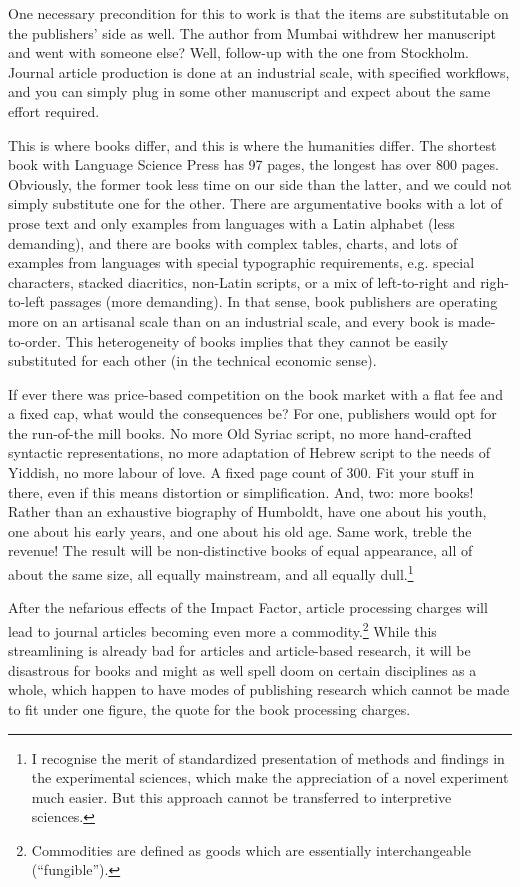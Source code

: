 \documentclass[12pt]{article}
\begin{document}
 One necessary precondition for this to work is that the items are substitutable on the publishers' side as well. The author from Mumbai withdrew her manuscript and went with someone else? Well, follow-up with the one from Stockholm. Journal article production is done at an industrial scale, with specified workflows, and you can simply plug in some other manuscript and expect about the same effort required. 
 
 This is where books differ, and this is where the humanities differ. The shortest book with Language Science Press has 97 pages, the longest has over 800 pages. Obviously, the former took less time on our side than the latter, and we could not simply substitute one for the other. There are argumentative books with a lot of prose text and only examples from languages with a Latin alphabet (less demanding), and there are books with complex tables, charts, and lots of examples from languages with special typographic requirements, e.g. special characters, stacked diacritics, non-Latin scripts, or a mix of left-to-right and righ-to-left passages (more demanding). In that sense, book publishers are operating more on an artisanal scale than on an industrial scale, and every book is made-to-order. This heterogeneity of books implies that they cannot be easily substituted for each other (in the technical economic sense).
 
 If ever there was price-based competition on the book market with a flat fee and a fixed cap, what would the consequences be? For one, publishers would opt for the run-of-the mill books. No more Old Syriac script,%
 no more hand-crafted syntactic representations, no more adaptation of Hebrew script to the needs of Yiddish, no more labour of love. A fixed page count of 300. Fit your stuff in there, even if this means distortion or simplification. And, two: more books! Rather than an exhaustive biography of Humboldt, have one about his youth, one about his early years, and one about his old age. Same work, treble the revenue! The result will be non-distinctive books of equal appearance, all of about the same size, all equally mainstream, and all equally dull.\footnote{I recognise the merit of standardized presentation of methods and findings in the experimental sciences, which make the appreciation of a novel experiment much easier. But this approach cannot be transferred to interpretive sciences.}
 
 After the nefarious effects of the Impact Factor, article processing charges will lead to journal articles becoming even more a commodity.\footnote{Commodities are defined as  goods which are essentially interchangeable (``fungible'').} While this streamlining is already bad for articles and article-based research, it will be disastrous for books and might as well spell doom on certain disciplines as a whole, which happen to have modes of publishing research which cannot be made to fit under one figure, the quote for the book processing charges. 
 
\end{document}
